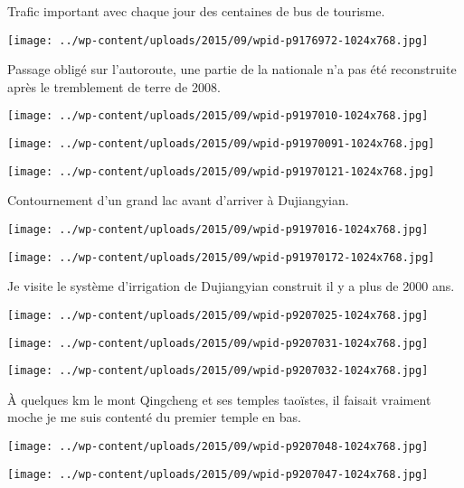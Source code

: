 \pagebreak
 Trafic important avec chaque jour des centaines de bus de tourisme.
\begin{center} \texttt{[image: ../wp-content/uploads/2015/09/wpid-p9176972-1024x768.jpg]} \end{center}

 Passage obligé sur l'autoroute, une partie de la nationale n'a pas été reconstruite après le tremblement de terre de 2008. 
\begin{center} \texttt{[image: ../wp-content/uploads/2015/09/wpid-p9197010-1024x768.jpg]} \end{center}
\begin{center} \texttt{[image: ../wp-content/uploads/2015/09/wpid-p91970091-1024x768.jpg]} \end{center}
\begin{center} \texttt{[image: ../wp-content/uploads/2015/09/wpid-p91970121-1024x768.jpg]} \end{center}

\pagebreak
 Contournement d'un grand lac avant d'arriver à Dujiangyian. 
\begin{center} \texttt{[image: ../wp-content/uploads/2015/09/wpid-p9197016-1024x768.jpg]} \end{center}
\begin{center} \texttt{[image: ../wp-content/uploads/2015/09/wpid-p91970172-1024x768.jpg]} \end{center}

\pagebreak
 Je visite le système d'irrigation de Dujiangyian construit il y a plus de 2000 ans. 
\begin{center} \texttt{[image: ../wp-content/uploads/2015/09/wpid-p9207025-1024x768.jpg]} \end{center}
\begin{center} \texttt{[image: ../wp-content/uploads/2015/09/wpid-p9207031-1024x768.jpg]} \end{center}
\begin{center} \texttt{[image: ../wp-content/uploads/2015/09/wpid-p9207032-1024x768.jpg]} \end{center}

 \`A quelques km le mont Qingcheng et ses temples taoïstes, il faisait vraiment moche je me suis contenté du premier temple en bas. 
\begin{center} \texttt{[image: ../wp-content/uploads/2015/09/wpid-p9207048-1024x768.jpg]} \end{center}
\begin{center} \texttt{[image: ../wp-content/uploads/2015/09/wpid-p9207047-1024x768.jpg]} \end{center}

